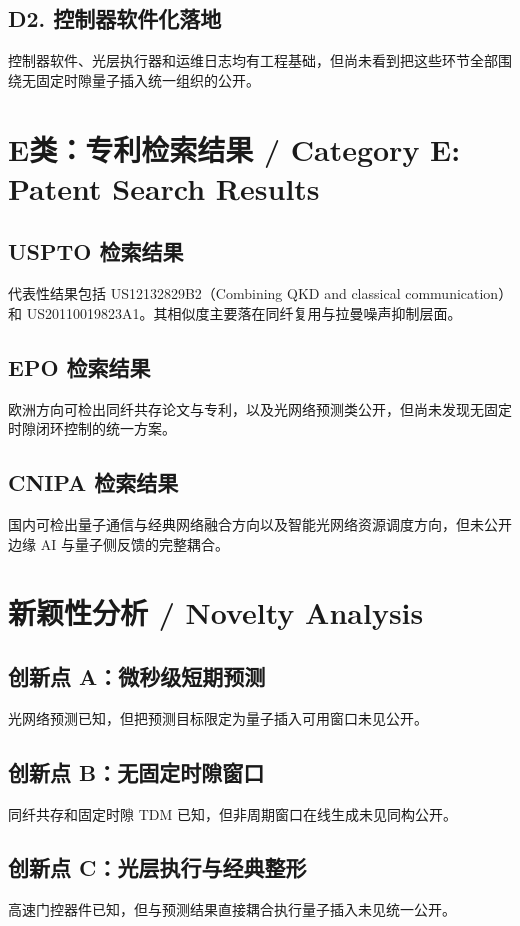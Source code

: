 ﻿\documentclass[12pt,a4paper]{article}
\begin{document}
\subsection{D2. 控制器软件化落地}
控制器软件、光层执行器和运维日志均有工程基础，但尚未看到把这些环节全部围绕无固定时隙量子插入统一组织的公开。

\section{E类：专利检索结果 / Category E: Patent Search Results}
\subsection{USPTO 检索结果}
代表性结果包括 US12132829B2（Combining QKD and classical communication）和 US20110019823A1。其相似度主要落在同纤复用与拉曼噪声抑制层面。

\subsection{EPO 检索结果}
欧洲方向可检出同纤共存论文与专利，以及光网络预测类公开，但尚未发现无固定时隙闭环控制的统一方案。

\subsection{CNIPA 检索结果}
国内可检出量子通信与经典网络融合方向以及智能光网络资源调度方向，但未公开边缘 AI 与量子侧反馈的完整耦合。

\section{新颖性分析 / Novelty Analysis}
\subsection{创新点 A：微秒级短期预测}
光网络预测已知，但把预测目标限定为量子插入可用窗口未见公开。

\subsection{创新点 B：无固定时隙窗口}
同纤共存和固定时隙 TDM 已知，但非周期窗口在线生成未见同构公开。

\subsection{创新点 C：光层执行与经典整形}
高速门控器件已知，但与预测结果直接耦合执行量子插入未见统一公开。
\end{document}
